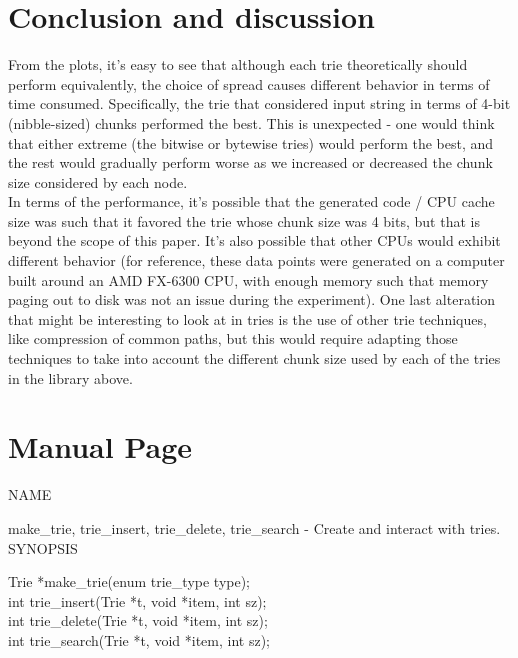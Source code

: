 \documentclass{llncs}
\begin{document}
\section{Conclusion and discussion}
From the plots, it's easy to see that although each trie theoretically should perform equivalently, the choice of spread causes different behavior in terms of time consumed. Specifically, the trie that considered input string in terms of 4-bit (nibble-sized) chunks performed the best. This is unexpected - one would think that either extreme (the bitwise or bytewise tries) would perform the best, and the rest would gradually perform worse as we increased or decreased the chunk size considered by each node.\\
In terms of the performance, it's possible that the generated code / CPU cache size was such that it favored the trie whose chunk size was 4 bits, but that is beyond the scope of this paper. It's also possible that other CPUs would exhibit different behavior (for reference, these data points were generated on a computer built around an AMD FX-6300 CPU, with enough memory such that memory paging out to disk was not an issue during the experiment).
One last alteration that might be interesting to look at in tries is the use of other trie techniques, like compression of common paths, but this would require adapting those techniques to take into account the different chunk size used by each of the tries in the library above.
\newpage
\ttdefault
\section{Manual Page}
\noindent NAME

make\_trie, trie\_insert, trie\_delete, trie\_search - Create and interact with tries.\\

\noindent SYNOPSIS

Trie *make\_trie(enum trie\_type type);\\
\indent int trie\_insert(Trie *t, void *item, int sz);\\
\indent int trie\_delete(Trie *t, void *item, int sz);\\
\indent int trie\_search(Trie *t, void *item, int sz);\\
\end{document}

